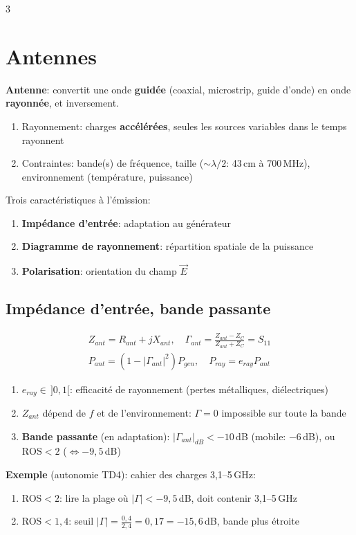 \documentclass[12pt, a4paper]{article}
\newcommand{\ve}[1]{\vec{#1}}
\newcommand{\ROS}{\mathrm{ROS}}
\begin{document}
\begin{multicols*}{3}
	\section{Antennes}
	\textbf{Antenne}: convertit une onde \textbf{guidée} (coaxial, microstrip, guide d'onde) en onde \textbf{rayonnée}, et inversement.
	\begin{enumerate}[\roman*.]
		\item Rayonnement: charges \textbf{accélérées}, seules les sources variables dans le temps rayonnent
		\item Contraintes: bande(s) de fréquence, taille ($\sim\lambda/2$: 43\,cm à 700\,MHz), environnement (température, puissance)
	\end{enumerate}
	Trois caractéristiques à l'émission:
	\begin{enumerate}[\roman*.]
		\item \textbf{Impédance d'entrée}: adaptation au générateur
		\item \textbf{Diagramme de rayonnement}: répartition spatiale de la puissance
		\item \textbf{Polarisation}: orientation du champ $\ve E$
	\end{enumerate}

	\subsection{Impédance d'entrée, bande passante}
	\begin{gather*}
		Z_{ant}=R_{ant}+jX_{ant},\quad\Gamma_{ant}=\frac{Z_{ant}-Z_C}{Z_{ant}+Z_C}=S_{11}\\
		P_{ant}=(1-|\Gamma_{ant}|^2)P_{gen},\quad P_{ray}=e_{ray}P_{ant}
	\end{gather*}
	\begin{enumerate}[\roman*.]
		\item $e_{ray}\in\,]0,1[$: efficacité de rayonnement (pertes métalliques, diélectriques)
		\item $Z_{ant}$ dépend de $f$ et de l'environnement: $\Gamma=0$ impossible sur toute la bande
		\item \textbf{Bande passante} (en adaptation): $|\Gamma_{ant}|_{dB}<-10$\,dB (mobile: $-6$\,dB), ou $\ROS<2$ ($\Leftrightarrow-9{,}5$\,dB)
	\end{enumerate}
	\textbf{Exemple} (autonomie TD4): cahier des charges 3,1--5\,GHz:
	\begin{enumerate}[\roman*.]
		\item ROS$<2$: lire la plage où $|\Gamma|<-9{,}5$\,dB, doit contenir 3,1--5\,GHz
		\item ROS$<1{,}4$: seuil $|\Gamma|=\frac{0{,}4}{2{,}4}=0{,}17=-15{,}6$\,dB, bande plus étroite
	\end{enumerate}


\end{multicols*}
\end{document}
